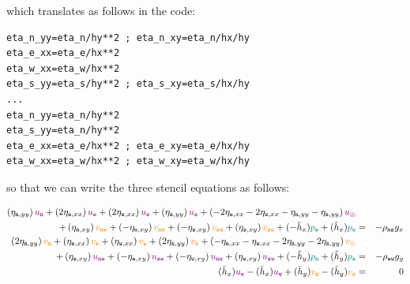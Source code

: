 which translates as follows in the code:

\begin{lstlisting}
eta_n_yy=eta_n/hy**2 ; eta_n_xy=eta_n/hx/hy
eta_e_xx=eta_e/hx**2
eta_w_xx=eta_w/hx**2
eta_s_yy=eta_s/hy**2 ; eta_s_xy=eta_s/hx/hy
...
eta_n_yy=eta_n/hy**2
eta_s_yy=eta_n/hy**2
eta_e_xx=eta_e/hx**2 ; eta_e_xy=eta_e/hx/hy
eta_w_xx=eta_w/hx**2 ; eta_w_xy=eta_w/hx/hy
\end{lstlisting}



so that we can write the three stencil equations as follows:

\begin{eqnarray}
\left( \eta_{{\tt n},yy} \right) {\color{violet} u_{\tt n}} + 
\left( 2\eta_{{\tt e},xx} \right) {\color{violet} u_{\tt e}} + 
\left( 2\eta_{{\tt w},xx} \right) {\color{violet} u_{\tt w}} + 
\left( \eta_{{\tt s},yy} \right) {\color{violet} u_{\tt s}} + 
\left( -2\eta_{{\tt e},xx} - 2\eta_{{\tt w},xx}
-\eta_{{\tt n},yy} -\eta_{{\tt s},yy}
\right) {\color{violet} u_\otimes} \nonumber\\
+
\left( \eta_{{\tt n},xy} \right) {\color{orange} v_{\tt ne}}+ 
\left(-\eta_{{\tt n},xy} \right) {\color{orange} v_{\tt nw}}+ 
\left(-\eta_{{\tt s},xy} \right) {\color{orange} v_{\tt se}}+ 
\left( \eta_{{\tt s},xy} \right) {\color{orange} v_{\tt sw}} 
+(- \tilde{h}_x) {\color{teal}p_{\tt e}} + (\tilde{h}_x ){\color{teal}p_{\tt w}} 
&=& -\rho_{\tt ns} g_x 
\nonumber\\
\left( 2\eta_{{\tt n},yy} \right) {\color{orange} v_{\tt n}} +
\left(  \eta_{{\tt e},xx} \right) {\color{orange} v_{\tt e}} +
\left(  \eta_{{\tt w},xx} \right) {\color{orange} v_{\tt w}} +
\left( 2\eta_{{\tt s},yy} \right) {\color{orange} v_{\tt s}} +
\left( 
-\eta_{{\tt e},xx}
-\eta_{{\tt w},xx}
-2\eta_{{\tt n},yy}
-2\eta_{{\tt s},yy}
\right) {\color{orange} v_\otimes} \nonumber\\
+
\left( \eta_{{\tt e},xy} \right) {\color{violet} u_{\tt ne}} +
\left(-\eta_{{\tt e},xy} \right) {\color{violet} u_{\tt se}} +
\left(-\eta_{{\tt w},xy} \right) {\color{violet} u_{\tt nw}} +
\left( \eta_{{\tt w},xy} \right) {\color{violet} u_{\tt sw}} 
+(-\tilde{h}_y ){\color{teal}p_{\tt n}} + (\tilde{h}_y) {\color{teal}p_{\tt s}}
&=& -\rho_{\tt ew} g_y \nonumber\\
(\tilde{h}_x) {\color{violet}u_{\tt e}}- 
(\tilde{h}_x) {\color{violet}u_{\tt w}}
+
(\tilde{h}_y) {\color{orange}v_{\tt n}}- 
(\tilde{h}_y){\color{orange}v_{\tt s}} &=&0 \nonumber
\end{eqnarray}




